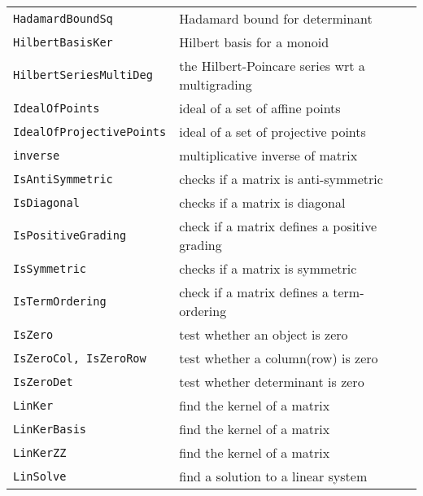\documentclass[a4paper]{mybook}
\begin{document}
\begin{center}
\begin{longtable}{ll}
{\verb~HadamardBoundSq~} &
      Hadamard bound for determinant\\
   
{\verb~HilbertBasisKer~} &
      Hilbert basis for a monoid\\
   
{\verb~HilbertSeriesMultiDeg~} &
      the Hilbert-Poincare series wrt a multigrading\\
   
{\verb~IdealOfPoints~} &
      ideal of a set of affine points\\
   
{\verb~IdealOfProjectivePoints~} &
      ideal of a set of projective points\\
   
{\verb~inverse~} &
      multiplicative inverse of matrix\\
   
{\verb~IsAntiSymmetric~} &
      checks if a matrix is anti-symmetric\\
   
{\verb~IsDiagonal~} &
      checks if a matrix is diagonal\\
   
{\verb~IsPositiveGrading~} &
      check if a matrix defines a positive grading\\
   
{\verb~IsSymmetric~} &
      checks if a matrix is symmetric\\
   
{\verb~IsTermOrdering~} &
      check if a matrix defines a term-ordering\\
   
{\verb~IsZero~} &
      test whether an object is zero\\
   
{\verb~IsZeroCol, IsZeroRow~} &
      test whether a column(row) is zero\\
   
{\verb~IsZeroDet~} &
      test whether determinant is zero\\
   
{\verb~LinKer~} &
      find the kernel of a matrix\\
   
{\verb~LinKerBasis~} &
      find the kernel of a matrix\\
   
{\verb~LinKerZZ~} &
      find the kernel of a matrix\\
   
{\verb~LinSolve~} &
      find a solution to a linear system\\
   

\end{longtable}
\end{center}
\end{document}
